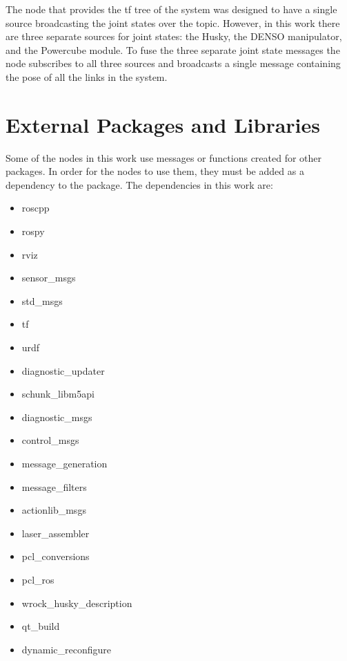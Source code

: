 The  node that provides the tf tree of the system was designed to have a single source broadcasting the joint states over the  topic. However, in this work there are three separate sources for joint states: the Husky, the DENSO manipulator, and the Powercube module. To fuse the three separate joint state messages the  node subscribes to all three sources and broadcasts a single message containing the pose of all the links in the system.\\
\section{External Packages and Libraries}
\label{sec:extpkg}
Some of the nodes in this work use messages or functions created for other packages. In order for the nodes to use them, they must be added as a dependency to the package. The dependencies in this work are:

\begin{itemize}
\item roscpp
\item rospy
\item rviz
\item sensor\_msgs
\item std\_msgs
\item tf
\item urdf 
\item diagnostic\_updater
\item schunk\_libm5api
\item diagnostic\_msgs
\item control\_msgs
\item message\_generation
\item message\_filters
\item actionlib\_msgs
\item laser\_assembler
\item pcl\_conversions 
\item pcl\_ros 
\item wrock\_husky\_description
\item qt\_build
\item dynamic\_reconfigure
\end{itemize}